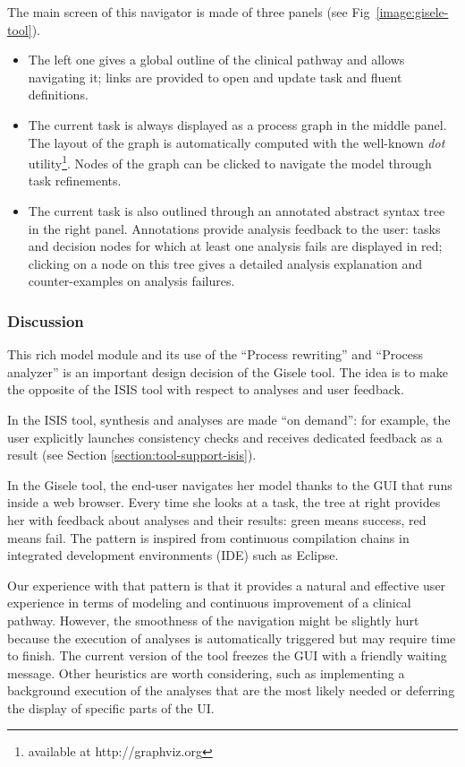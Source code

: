 \begin{description}
The main screen of this navigator is made of three panels (see Fig~\ref{image:gisele-tool}). 
\begin{itemize}
\item The left one gives a global outline of the clinical pathway and allows navigating it; links are provided to open and update task and fluent definitions.
\item The current task is always displayed as a process graph in the middle panel. The layout of the graph is automatically computed with the well-known \emph{dot} utility\footnote{available at http://graphviz.org}. Nodes of the graph can be clicked to navigate the model through task refinements.
\item The current task is also outlined through an annotated abstract syntax tree in the right panel. Annotations provide analysis feedback to the user: tasks and decision nodes for which at least one analysis fails are displayed in red; clicking on a node on this tree gives a detailed analysis explanation and counter-examples on analysis failures.
\end{itemize}

\end{description}

\subsubsection*{Discussion}

This rich model module and its use of the ``Process rewriting'' and ``Process analyzer'' is an important design decision of the Gisele tool. The idea is to make the opposite of the ISIS tool with respect to analyses and user feedback. 

In the ISIS tool, synthesis and analyses are made ``on demand'': for example, the user explicitly launches consistency checks and receives dedicated feedback as a result (see Section \ref{section:tool-support-isis}).

In the Gisele tool, the end-user navigates her model thanks to the GUI that runs inside a web browser. Every time she looks at a task, the tree at right provides her with feedback about analyses and their results: green means success, red means fail. The pattern is inspired from continuous compilation chains in integrated development environments (IDE) such as Eclipse. 

Our experience with that pattern is that it provides a natural and effective user experience in terms of modeling and continuous improvement of a clinical pathway. However, the smoothness of the navigation might be slightly hurt because the execution of analyses is automatically triggered but may require time to finish. The current version of the tool freezes the GUI with a friendly waiting message. Other heuristics are worth considering, such as implementing a background execution of the analyses that are the most likely needed or deferring the display of specific parts of the UI.
